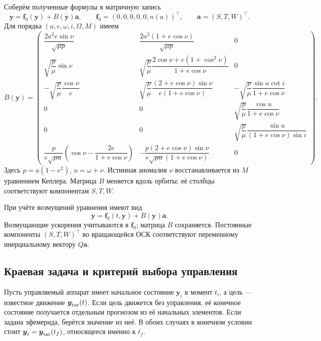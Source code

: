 \documentclass[a4paper,11pt]{article}
\numberwithin{equation}{section}
\theoremstyle{remark}
\newcommand{\vect}[1]{\boldsymbol{#1}}
\begin{document}
Соберём полученные формулы в матричную запись
\begin{equation}
 \dot{\vect y}=\vect f_0(\vect y)+B(\vect y)\vect a,\qquad
 \vect f_0=(0,0,0,0,0,n(a))^\top,\qquad
 \vect a=(S,T,W)^\top.
 \label{eq:gauss-matrix}
\end{equation}
Для порядка $(a,e,\omega,i,\Omega,M)$ имеем
\begin{equation}
 B(\vect y)=\begin{pmatrix}
 \dfrac{2a^2e\sin\nu}{\sqrt{\mu p}}&
 \dfrac{2a^2(1+e\cos\nu)}{\sqrt{\mu p}}&0\\[5pt]
 \sqrt{\dfrac p\mu}\sin\nu&
 \sqrt{\dfrac p\mu}
 \dfrac{2\cos\nu+e(1+\cos^2\nu)}{1+e\cos\nu}&0\\[5pt]
 -\sqrt{\dfrac p\mu}\dfrac{\cos\nu}{e}&
 \sqrt{\dfrac p\mu}
 \dfrac{(2+e\cos\nu)\sin\nu}{e(1+e\cos\nu)}&
 -\sqrt{\dfrac p\mu}\dfrac{\sin u\cot i}{1+e\cos\nu}\\[5pt]
 0&0&\sqrt{\dfrac p\mu}\dfrac{\cos u}{1+e\cos\nu}\\[5pt]
 0&0&\sqrt{\dfrac p\mu}\dfrac{\sin u}{(1+e\cos\nu)\sin i}\\[5pt]
 \dfrac{p}{e\sqrt{\mu a}}
 \left(\cos\nu-\dfrac{2e}{1+e\cos\nu}\right)&
 -\dfrac{p(2+e\cos\nu)\sin\nu}{e\sqrt{\mu a}(1+e\cos\nu)}&0
 \end{pmatrix}.
 \label{eq:B-classical}
\end{equation}
Здесь $p=a(1-e^2)$, $u=\omega+\nu$.
Истинная аномалия $\nu$ восстанавливается из $M$ уравнением
Кеплера. Матрица $B$ меняется вдоль орбиты;
её столбцы соответствуют компонентам $S,T,W$.

При учёте возмущений уравнения имеют вид
\begin{equation}
 \dot{\vect y}=\vect f_0(t,\vect y)+B(\vect y)\vect a.
 \label{eq:general-element-dynamics}
\end{equation}
Возмущающие ускорения учитываются в $\vect f_0$;
матрица $B$ сохраняется. Постоянные компоненты $(S,T,W)^\top$
во вращающейся ОСК соответствуют переменному инерциальному
вектору $Q\vect a$.

\subsection{Краевая задача и критерий выбора управления}

Пусть управляемый аппарат имеет начальное состояние $\vect y_i$
в момент $t_i$, а цель --- известное движение
$\vect y_{\rm tar}(t)$. Если цель движется без управления, её
конечное состояние получается отдельным прогнозом из её
начальных элементов. Если задана эфемерида, берётся значение
из неё. В обоих случаях в конечном условии стоит
$\vect y_t=\vect y_{\rm tar}(t_f)$, относящееся именно к $t_f$.
\end{document}
